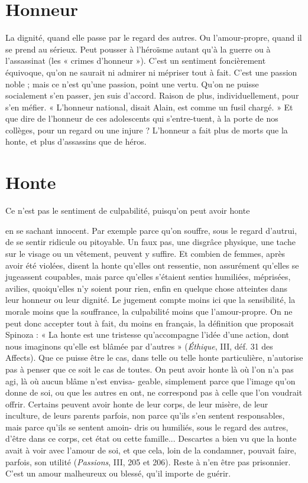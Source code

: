 \section{Honneur}
La dignité, quand elle passe par le regard des autres. Ou
l’amour-propre, quand il se prend au sérieux. Peut pousser à
l’héroïsme autant qu’à la guerre ou à l'assassinat (les « crimes d’honneur »).
C’est un sentiment foncièrement équivoque, qu’on ne saurait ni admirer ni
mépriser tout à fait. C’est une passion noble ; mais ce n’est qu’une passion,
point une vertu. Qu’on ne puisse socialement s’en passer, jen suis d’accord.
Raison de plus, individuellement, pour s’en méfier. « L’honneur national,
disait Alain, est comme un fusil chargé. » Et que dire de l’honneur de ces adolescents
qui s’entre-tuent, à la porte de nos collèges, pour un regard ou une
injure ? L’honneur a fait plus de morts que la honte, et plus d’assassins que de
héros.

\section{Honte}
Ce n’est pas le sentiment de culpabilité, puisqu’on peut avoir honte

en se sachant innocent. Par exemple parce qu’on souffre, sous le
regard d’autrui, de se sentir ridicule ou pitoyable. Un faux pas, une disgrâce
physique, une tache sur le visage ou un vêtement, peuvent y suffire. Et combien
de femmes, après avoir été violées, disent la honte qu’elles ont ressentie,
non assurément qu’elles se jugeassent coupables, mais parce qu’elles s'étaient
senties humiliées, méprisées, avilies, quoiqu’elles n’y soient pour rien, enfin en
quelque chose atteintes dans leur honneur ou leur dignité. Le jugement compte
moins ici que la sensibilité, la morale moins que la souffrance, la culpabilité
moins que l’amour-propre. On ne peut donc accepter tout à fait, du moins en
français, la définition que proposait Spinoza : « La honte est une tristesse
qu’accompagne l’idée d’une action, dont nous imaginons qu’elle est blâmée par
d’autres » ({\it Éthique}, III, déf. 31 des Affects). Que ce puisse être le cas, dans telle
ou telle honte particulière, n'autorise pas à penser que ce soit le cas de toutes.
On peut avoir honte là où l’on n’a pas agi, là où aucun blâme n’est envisa-
geable, simplement parce que l’image qu’on donne de soi, ou que les autres en
ont, ne correspond pas à celle que l’on voudrait offrir. Certains peuvent avoir
honte de leur corps, de leur misère, de leur inculture, de leurs parents parfois,
non parce qu'ils s’en sentent responsables, mais parce qu’ils se sentent amoin-
dris ou humiliés, sous le regard des autres, d’être dans ce corps, cet état ou cette
famille... Descartes a bien vu que la honte avait à voir avec l’amour de soi, et
que cela, loin de la condamner, pouvait faire, parfois, son utilité ({\it Passions}, III,
205 et 206). Reste à n’en être pas prisonnier. C’est un amour malheureux ou
blessé, qu’il importe de guérir.

